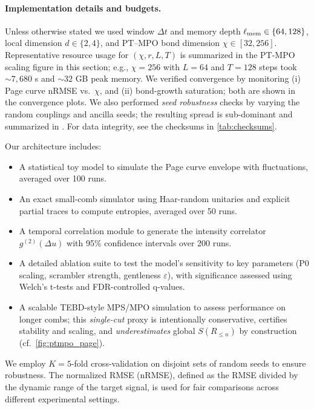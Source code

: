 \documentclass[a4paper,11pt]{article}
\theoremstyle{plain}
\theoremstyle{definition}
\theoremstyle{remark}
\begin{document}
\paragraph{Implementation details and budgets.}
Unless otherwise stated we used window \(\Delta t\) and memory depth \(\ell_{\rm mem}\in\{64,128\}\), local dimension \(d\in\{2,4\}\), and PT--MPO bond dimension \(\chi\in[32,256]\).
Representative resource usage for \((\chi,r,L,T)\) is summarized in the PT-MPO scaling figure in this section;
e.g., \(\chi=256\) with \(L=64\) and \(T=128\) steps took \(\sim 7{,}680\) s and \(\sim 32\) GB peak memory.
We verified convergence by monitoring (i) Page curve nRMSE vs.\ \(\chi\), and (ii) bond-growth saturation; both are shown in the convergence plots.
We also performed \emph{seed robustness} checks by varying the random couplings and ancilla seeds; the resulting spread is sub-dominant and summarized in .
For data integrity, see the checksums in \cref{tab:checksums}.

Our architecture includes:
\begin{itemize}[leftmargin=*]
    \item A statistical toy model to simulate the Page curve envelope with fluctuations, averaged over 100 runs.
    \item An exact small-comb simulator using Haar-random unitaries and explicit partial traces to compute entropies, averaged over 50 runs.
    \item A temporal correlation module to generate the intensity correlator $g^{(2)}(\Delta u)$ with 95\% confidence intervals over 200 runs.
    \item A detailed ablation suite to test the model's sensitivity to key parameters (P0 scaling, scrambler strength, gentleness $\varepsilon$), with significance assessed using Welch's t-tests and FDR-controlled q-values.
    \item A scalable TEBD-style MPS/MPO simulation to assess performance on longer combs; this \emph{single-cut} proxy is intentionally conservative, certifies stability and scaling, and \emph{underestimates} global $S(R_{\le n})$ by construction (cf.~\cref{fig:ptmpo_page}).
\end{itemize}
We employ $K=5$-fold cross-validation on disjoint sets of random seeds to ensure robustness. The normalized RMSE (nRMSE), defined as the RMSE divided by the dynamic range of the target signal, is used for fair comparisons across different experimental settings.
\end{document}
